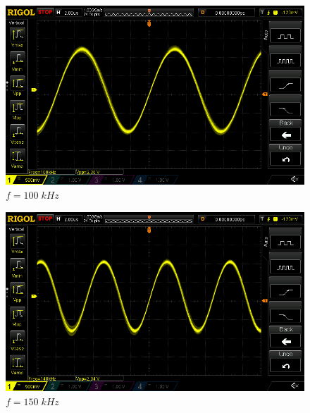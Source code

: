 \documentclass[uplatex,a4paper,11pt,oneside,openany]{jsbook}
\begin{document}
\begin{spacing}{0.67}
  \begin{multicols}{2}
    \begin{figure}[H]
       \centering
        \includegraphics[keepaspectratio, scale=0.28, angle=0]
                    {rigol/figs/FrqCharM1Y1_2kR/100khz.png}
                    \caption{$f=100\;kHz$}
                    \label{fig:frq100k}
    \end{figure}
  
    \begin{figure}[H]
       \centering
        \includegraphics[keepaspectratio, scale=0.28, angle=0]
                  {rigol/figs/FrqCharM1Y1_2kR/150khz.png}
                  \caption{$f=150\;kHz$}
                  \label{fig:frq150k}
    \end{figure}
  \end{multicols}


\end{spacing}
\end{document}
